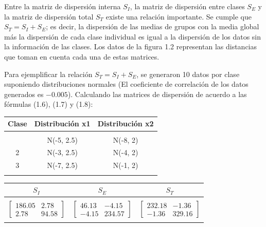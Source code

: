 Entre la matriz de dispersión interna $S_I$, la matriz de dispersión entre clases $S_E$ y la matriz de dispersión total $S_T$ existe una relación importante. Se cumple que $S_T = S_I + S_E $; es decir, la dispersión de las medias de grupos con la media global más la dispersión de cada clase individual es igual a la dispersión de los datos sin la información de las clases. Los datos de la figura 1.2 representan las distancias que toman en cuenta cada una de estas matrices. 

\pagebreak
Para ejemplificar la relación $S_T = S_I + S_E$, se generaron 10 datos por clase suponiendo distribuciones normales (El coeficiente de correlación de los datos generados es $-0.005$). Calculando las matrices de dispersión de acuerdo a las fórmulas (1.6), (1.7) y (1.8):

\begin{center}
\begin{tabular}{ c c c}
\toprule
\textbf{Clase} & \textbf{Distribución x1} & \textbf{Distribución x2} \\
\midrule\\
\addlinespace[-2ex]
1 & N(-5, 2.5) & N(-8, 2)\\
2 & N(-3, 2.5) & N(-4, 2)\\
3 & N(-7, 2.5) & N(-1, 2) \\
\addlinespace[1.5ex]
\bottomrule
\end{tabular}
\end{center}


\begin{center}
\begin{tabular}{ c c c}
\toprule
\textbf{$S_I$} & \textbf{$S_E$} & \textbf{$S_T$} \\
\midrule\\
\addlinespace[-2ex]
$ \begin{bmatrix}  186.05 & 2.78 \\ 2.78 &  94.58 \end{bmatrix}$ &
$ \begin{bmatrix} 46.13 & -4.15 \\ -4.15 & 234.57 \end{bmatrix}$ &
$ \begin{bmatrix}  232.18 & -1.36 \\ -1.36 &  329.16 \end{bmatrix}$ \\
\addlinespace[1.5ex]
\bottomrule
\end{tabular}
\end{center}

